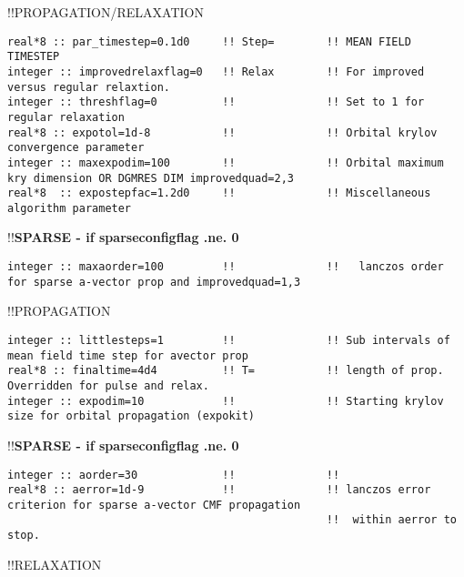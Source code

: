 !!{\large \quad PROPAGATION/RELAXATION}
\begin{verbatim}
real*8 :: par_timestep=0.1d0     !! Step=        !! MEAN FIELD TIMESTEP
integer :: improvedrelaxflag=0   !! Relax        !! For improved versus regular relaxtion.   
integer :: threshflag=0          !!              !! Set to 1 for regular relaxation
real*8 :: expotol=1d-8           !!              !! Orbital krylov convergence parameter
integer :: maxexpodim=100        !!              !! Orbital maximum kry dimension OR DGMRES DIM improvedquad=2,3
real*8  :: expostepfac=1.2d0     !!              !! Miscellaneous algorithm parameter
\end{verbatim}
!!\textbf{\qquad SPARSE - if sparseconfigflag .ne. 0}
\begin{verbatim}
integer :: maxaorder=100         !!              !!   lanczos order for sparse a-vector prop and improvedquad=1,3
\end{verbatim}
!!{\large \quad PROPAGATION}
\begin{verbatim}
integer :: littlesteps=1         !!              !! Sub intervals of mean field time step for avector prop
real*8 :: finaltime=4d4          !! T=           !! length of prop.  Overridden for pulse and relax.  
integer :: expodim=10            !!              !! Starting krylov size for orbital propagation (expokit)
\end{verbatim}
!!\textbf{\qquad SPARSE - if sparseconfigflag .ne. 0}
\begin{verbatim}
integer :: aorder=30             !!              !!   
real*8 :: aerror=1d-9            !!              !! lanczos error criterion for sparse a-vector CMF propagation
                                                 !!  within aerror to stop.
\end{verbatim}
!!{\large \quad RELAXATION}
